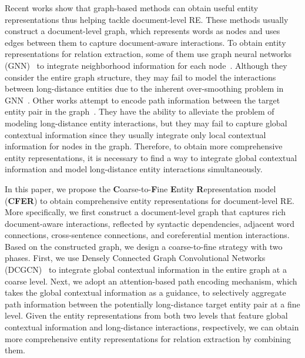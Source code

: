\documentclass{article}
\newcommand{\citep}{\cite}
\begin{document}
Recent works show that graph-based methods can obtain useful entity representations thus helping tackle document-level RE. 
These methods usually construct a document-level graph, which represents words as nodes and uses edges between them to capture document-aware interactions. 
To obtain entity representations for relation extraction, some of them use  graph neural networks (GNN)~\citep{labelled_edge_gcn,dcgcn} to integrate neighborhood information for each node~\citep{gcnn,lsr}. 
Although they consider the entire graph structure, they may fail to model the interactions between long-distance entities due to the inherent over-smoothing problem in GNN~\citep{over_smoothing}. 
Other works attempt to encode path information between the target entity pair in the graph~\citep{quirk_and_poon,eog}. 
They have the ability to alleviate the problem of modeling long-distance entity interactions, but they may fail to capture global contextual information since they usually integrate only local contextual information for nodes in the graph. 
Therefore, to obtain more comprehensive entity representations, it is necessary to find a way to integrate global contextual information and model long-distance entity interactions simultaneously. 

In this paper, we propose the \textbf{C}oarse-to-\textbf{F}ine \textbf{E}ntity \textbf{R}epresentation model (\textbf{CFER}) to obtain comprehensive entity representations for document-level RE. 
More specifically, we first construct a document-level graph that captures rich document-aware interactions, reflected by syntactic dependencies, adjacent word connections, cross-sentence connections, and coreferential mention interactions. 
Based on the constructed graph, we design a coarse-to-fine strategy with two phases. 
First, we use Densely Connected Graph Convolutional Networks (DCGCN)~\citep{dcgcn} to integrate global contextual information in the entire graph at a coarse level. 
Next, we adopt an attention-based path encoding mechanism, which takes the global contextual information as a guidance, to selectively aggregate path information between the potentially long-distance target entity pair at a fine level. 
Given the entity representations from both two levels that feature global contextual information and long-distance interactions, respectively, we can obtain more comprehensive entity representations for relation extraction by combining them. 
\end{document}
